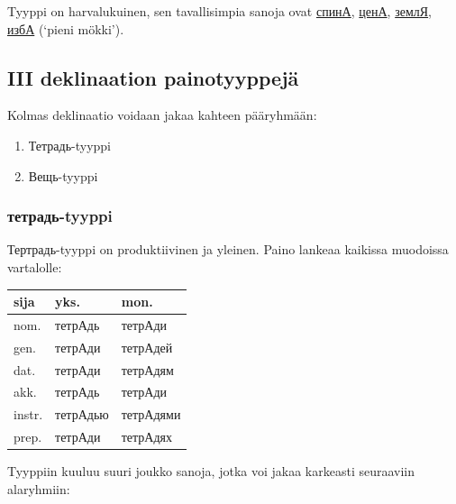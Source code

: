 \documentclass[]{scrreprt}
\providecommand{\tightlist}{%
  \setlength{\itemsep}{0pt}\setlength{\parskip}{0pt}}
\begin{document}
Tyyppi on harvalukuinen, sen tavallisimpia sanoja ovat
\href{http://ru.wiktionary.org/wiki/\%D1\%81\%D0\%BF\%D0\%B8\%D0\%BD\%D0\%B0}{спинА},
\href{http://ru.wiktionary.org/wiki/\%D1\%86\%D0\%B5\%D0\%BD\%D0\%B0}{ценА},
\href{http://ru.wiktionary.org/wiki/\%D0\%B7\%D0\%B5\%D0\%BC\%D0\%BB\%D1\%8F}{землЯ},
\href{http://ru.wiktionary.org/wiki/\%D0\%B8\%D0\%B7\%D0\%B1\%D0\%B0}{избА}
(`pieni mökki').

\subsection{III deklinaation
painotyyppejä}\label{iii-deklinaation-painotyyppejuxe4}

Kolmas deklinaatio voidaan jakaa kahteen pääryhmään:

\begin{enumerate}
\def\labelenumi{\arabic{enumi}.}
\tightlist
\item
  Тетрадь-tyyppi
\item
  Вещь-tyyppi
\end{enumerate}

\subsubsection{тетрадь-tyyppi}\label{ux442ux435ux442ux440ux430ux434ux44c-tyyppi}

Тертрадь-tyyppi on produktiivinen ja yleinen. Paino lankeaa kaikissa
muodoissa vartalolle:

\begin{longtable}[c]{@{}lll@{}}
\toprule
sija & yks. & mon.\tabularnewline
\midrule
\endhead
nom. & тетрАдь & тетрАди\tabularnewline
gen. & тетрАди & тетрАдей\tabularnewline
dat. & тетрАди & тетрАдям\tabularnewline
akk. & тетрАдь & тетрАди\tabularnewline
instr. & тетрАдью & тетрАдями\tabularnewline
prep. & тетрАди & тетрАдях\tabularnewline
\bottomrule
\end{longtable}

Tyyppiin kuuluu suuri joukko sanoja, jotka voi jakaa karkeasti
seuraaviin alaryhmiin:
\end{document}
